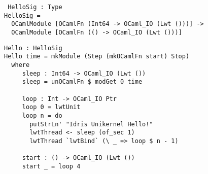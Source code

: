 \documentclass[a4paper,11pt,twocolumn]{article}
\newcommand{\malfunction}{\texttt{malfunction}}
\begin{document}
\begin{lstlisting}
 HelloSig : Type
HelloSig =
  OCamlModule [OCamlFn (Int64 -> OCaml_IO (Lwt ()))] ->
  OCamlModule [OCamlFn (() -> OCaml_IO (Lwt ()))]
\end{lstlisting}

\begin{lstlisting}
Hello : HelloSig
Hello time = mkModule (Step (mkOCamlFn start) Stop)
  where
     sleep : Int64 -> OCaml_IO (Lwt ())
     sleep = unOCamlFn $ modGet 0 time

     loop : Int -> OCaml_IO Ptr
     loop 0 = lwtUnit
     loop n = do
       putStrLn' "Idris Unikernel Hello!"
       lwtThread <- sleep (of_sec 1)
       lwtThread `lwtBind` (\ _ => loop $ n - 1)

     start : () -> OCaml_IO (Lwt ())
     start _ = loop 4
\end{lstlisting}




\end{document}
